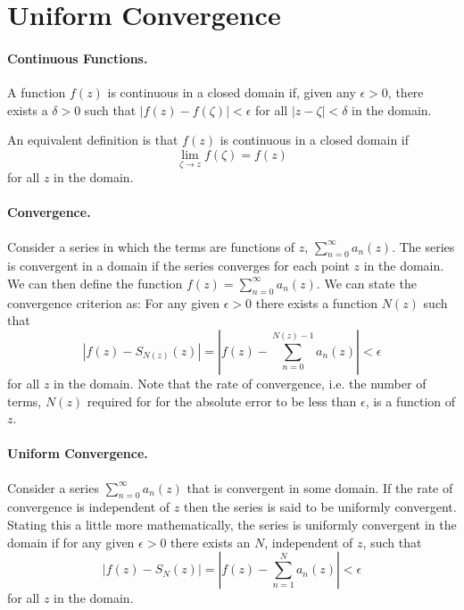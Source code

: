 \section{Uniform Convergence}
\label{sec_unif_conv}



\paragraph{Continuous Functions.}
A function $f(z)$ is continuous in a closed domain if, given any
$\epsilon > 0$, there exists a $\delta > 0$ such that
$|f(z) - f(\zeta)| < \epsilon$ for all $|z-\zeta| < \delta$ in the domain.

An equivalent definition is that $f(z)$ is continuous in a closed domain
if 
\[
\lim_{\zeta \to z} f(\zeta) = f(z)
\]
for all $z$ in the domain.


\paragraph{Convergence.}
Consider a series in which the terms are functions of $z$, $\sum_{n = 0}^\infty a_n(z)$.
The series is convergent in a domain if the series converges 
for each point $z$ in the domain.  We can then define the function
$f(z) = \sum_{n = 0}^\infty a_n(z)$.  We can state the convergence criterion as:  
For any given $\epsilon > 0$ there exists a function $N(z)$ such that
\[ 
|f(z) - S_{N(z)}(z)| = \left|f(z) - \sum_{n=0}^{N(z)-1} a_n(z) \right| < \epsilon 
\]
for all $z$ in the domain.  Note that the rate of convergence, i.e. the 
number of terms, $N(z)$ required for for the absolute error to be less 
than $\epsilon$, is a function of $z$. 




\paragraph{Uniform Convergence.}
Consider a series $\sum_{n = 0}^\infty a_n(z)$ that is convergent in some domain.
If the rate of convergence is independent of $z$ then the series
is said to be uniformly convergent.  Stating this a little more mathematically,
the series is uniformly convergent in the domain if for any given $\epsilon
> 0$ there exists an $N$, independent of $z$, such that
\[ 
|f(z) - S_{N}(z)| = \left|f(z) - \sum_{n=1}^{N} a_n(z) \right| < \epsilon 
\]
for all $z$ in the domain.





